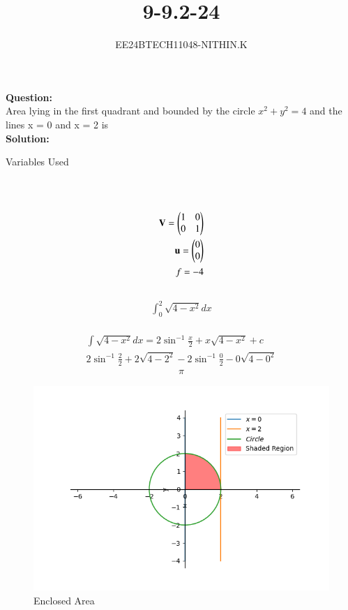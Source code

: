 \documentclass[journal]{IEEEtran}
\begin{document}


\title{9-9.2-24}
\author{EE24BTECH11048-NITHIN.K}
{\let\newpage\relax\maketitle}

\textbf{Question:} \\
Area lying in the first quadrant and bounded by the circle $x^2 + y^2 = 4$ and the lines
x = 0 and x = 2 is \\
\textbf{Solution:} \\
\begin{table}[h!]
      \centering
      
      \caption{Variables Used}
\end{table}\\
 \\
\begin{align}
	\mathbf{V} = \begin{pmatrix} 1 & 0 \\
	0 & 1 \end{pmatrix} \\
	\mathbf{u} = \begin{pmatrix}0 \\
	0 \end{pmatrix} \\
	f = -4 \\
\end{align}
 \\
\begin{align}
	\int_{0}^{2}\sqrt{4 - x^2} dx
\end{align}
 \\
\begin{align}
	\int\sqrt{4 - x^2} dx = 2\sin^{-1}\frac{x}{2} + x\sqrt{4 - x^2} + c \\
	2\sin^{-1}\frac{2}{2} + 2\sqrt{4 - 2^2} - 2\sin^{-1}\frac{0}{2} - 0\sqrt{4 - 0^2}
\end{align}
\begin{align}
	\pi
\end{align}
\begin{figure}[h]
\centering
\includegraphics[width=0.7\linewidth]{figs/Figure_1.png}
\caption{Enclosed Area}
\end{figure}
\end{document}
